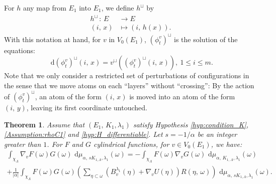 \documentclass[11pt,a4paper]{amsart}
\newtheorem{Theorem}{Theorem}
\begin{document}
For $h$ any map from $E_1$ into $E_1$, we define $h^\sqcup$ by
\begin{align*}
  h^\sqcup \,: \, E&\longrightarrow E\\
  (i,\, x) &\longmapsto (i,\, h(x)).
\end{align*}
With this notation at hand, for $v$ in $V_0(E_1)$, $(\phi_t^v)^\sqcup$
is the solution of the equations:
\begin{equation*}
  {\text{ d}} (\phi_t^v)^\sqcup(i,\, x)=v^\sqcup((\phi_t^v)^\sqcup(i,\, x)), \
  1\le i \le m.
\end{equation*}
Note that we only consider a restricted set of perturbations of
configurations in the sense that we move atoms on each ``layers''
without ``crossing'': By the action of $(\phi_t^v)^\sqcup$, an atom of
the form $(i,\, x)$ is moved into an atom of the form $(i,\, y)$,
leaving its first coordinate untouched.
\begin{Theorem}
  \label{thm:ipp_alpha_determinantal}
  Assume that $(E_1,\, K_1, \lambda_1)$ satisfy Hypothesis
  \ref{hyp:condition_K}, \ref{Assumption:rhoC1} and
  \ref{hyp:H_differentiable}. Let $s=-1/\alpha$ be an integer greater
  than $1$. For $F$ and $G$ cylindrical functions, for $v\in
  V_0(E_1)$, we have:
  \begin{multline*}
    \int_{\chi_\Lambda} \nabla_{v} F(\omega) G(\omega){\text{ d}}\mu_{\alpha,\,
      sK_{1,\Lambda},\lambda_1}(\omega) =-\int_{\chi_\Lambda}
    F(\omega)\nabla_{v} G(\omega){\text{ d}}\mu_{\alpha,\, K_{1,\,\Lambda},\lambda_1}(\omega)\\
    +\frac 1{|\alpha|}\int_{\chi_\Lambda}
    F(\omega)G(\omega)\left(\sum_{\eta\subset\omega}
      (B^{\lambda_1}_v(\eta)+\nabla_vU(\eta))R(\eta,\, \omega)
    \right){\text{ d}}\mu_{\alpha,\,sK_{1,\Lambda},\lambda_1}(\omega).
  \end{multline*}
\end{Theorem}
\end{document}
